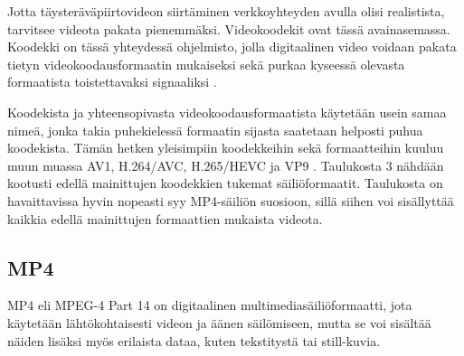 \documentclass[finnish, 12pt, a4paper, elec, utf8, a-1b, online]{aaltothesis}
\begin{document}
\noindent Jotta täysteräväpiirtovideon siirtäminen verkkoyhteyden avulla olisi realistista, tarvitsee videota pakata pienemmäksi. Videokoodekit ovat tässä avainasemassa. Koodekki on tässä yhteydessä ohjelmisto, jolla digitaalinen video voidaan pakata tietyn videokoodausformaatin mukaiseksi sekä purkaa kyseessä olevasta formaatista toistettavaksi signaaliksi \cite{Codec}.

\noindent Koodekista ja yhteensopivasta videokoodausformaatista käytetään usein samaa nimeä, jonka takia puhekielessä formaatin sijasta saatetaan helposti puhua koodekista. Tämän hetken yleisimpiin koodekkeihin sekä formaatteihin kuuluu muun muassa AV1, H.264/AVC, H.265/HEVC ja VP9 \cite{Codec guide}. Taulukosta 3 nähdään kootusti edellä mainittujen koodekkien tukemat säiliöformaatit. Taulukosta on havaittavissa hyvin nopeasti syy MP4-säiliön suosioon, sillä siihen voi sisällyttää kaikkia edellä mainittujen formaattien mukaista videota.

\begin{table}[htb]
  \caption{Suosittuja videokoodekkeja ja niiden säiliöitä. \cite{Codec guide} \label{taulukko3}}
  \centering
\end{table}

\subsection*{MP4}

MP4 eli MPEG-4 Part 14 on digitaalinen multimediasäiliöformaatti, jota käytetään lähtökohtaisesti videon ja äänen säilömiseen, mutta se voi sisältää näiden lisäksi myös erilaista dataa, kuten tekstitystä tai still-kuvia. \\

\end{document}
